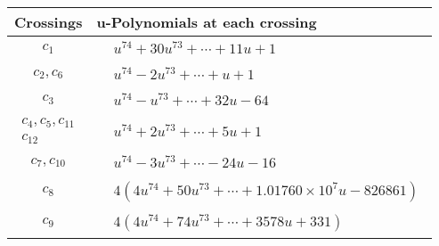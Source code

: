 \documentclass[1p]{elsarticle_modified}
\theoremstyle{definition}
\begin{document}
\begin{tabular}{m{50pt}|m{274pt}}
Crossings & \hspace{64pt}u-Polynomials at each crossing \\
\hline $$\begin{aligned}c_{1}\end{aligned}$$&$\begin{aligned}
&u^{74}+30 u^{73}+\cdots+11 u+1
\end{aligned}$\\
\hline $$\begin{aligned}c_{2},c_{6}\end{aligned}$$&$\begin{aligned}
&u^{74}-2 u^{73}+\cdots+u+1
\end{aligned}$\\
\hline $$\begin{aligned}c_{3}\end{aligned}$$&$\begin{aligned}
&u^{74}- u^{73}+\cdots+32 u-64
\end{aligned}$\\
\hline $$\begin{aligned}c_{4},c_{5},c_{11}\\c_{12}\end{aligned}$$&$\begin{aligned}
&u^{74}+2 u^{73}+\cdots+5 u+1
\end{aligned}$\\
\hline $$\begin{aligned}c_{7},c_{10}\end{aligned}$$&$\begin{aligned}
&u^{74}-3 u^{73}+\cdots-24 u-16
\end{aligned}$\\
\hline $$\begin{aligned}c_{8}\end{aligned}$$&$\begin{aligned}
&4(4 u^{74}+50 u^{73}+\cdots+1.01760\times10^{7} u-826861)
\end{aligned}$\\
\hline $$\begin{aligned}c_{9}\end{aligned}$$&$\begin{aligned}
&4(4 u^{74}+74 u^{73}+\cdots+3578 u+331)
\end{aligned}$\\
\hline
\end{tabular}\\~\\
\end{document}
